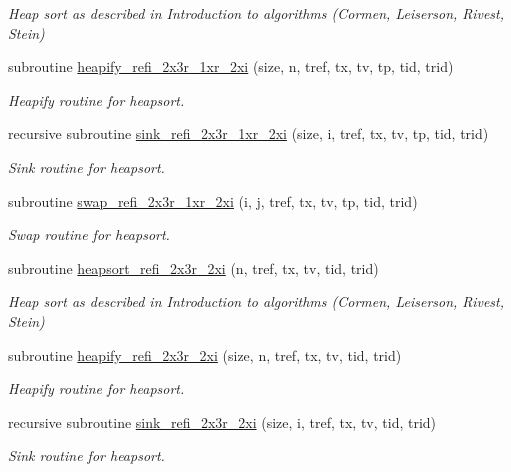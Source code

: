 \begin{DoxyCompactItemize}
\begin{DoxyCompactList}\small\item\em Heap sort as described in Introduction to algorithms (Cormen, Leiserson, Rivest, Stein) \end{DoxyCompactList}\item 
subroutine \hyperlink{classmodsortinterf_a29a5315a689bd72fbc9a80e973c3f483}{heapify\-\_\-refi\-\_\-2x3r\-\_\-1xr\-\_\-2xi} (size, n, tref, tx, tv, tp, tid, trid)
\begin{DoxyCompactList}\small\item\em Heapify routine for heapsort. \end{DoxyCompactList}\item 
recursive subroutine \hyperlink{classmodsortinterf_a7e96a23102d4d62aff260053b1cc3657}{sink\-\_\-refi\-\_\-2x3r\-\_\-1xr\-\_\-2xi} (size, i, tref, tx, tv, tp, tid, trid)
\begin{DoxyCompactList}\small\item\em Sink routine for heapsort. \end{DoxyCompactList}\item 
subroutine \hyperlink{classmodsortinterf_a1fcb9b3d321e7e868665ffd66b01c5ff}{swap\-\_\-refi\-\_\-2x3r\-\_\-1xr\-\_\-2xi} (i, j, tref, tx, tv, tp, tid, trid)
\begin{DoxyCompactList}\small\item\em Swap routine for heapsort. \end{DoxyCompactList}\item 
subroutine \hyperlink{classmodsortinterf_af0070ac4a4a32d7b75892c431a266ce5}{heapsort\-\_\-refi\-\_\-2x3r\-\_\-2xi} (n, tref, tx, tv, tid, trid)
\begin{DoxyCompactList}\small\item\em Heap sort as described in Introduction to algorithms (Cormen, Leiserson, Rivest, Stein) \end{DoxyCompactList}\item 
subroutine \hyperlink{classmodsortinterf_a0bceff7025bb4957c4d34cf93aabe88e}{heapify\-\_\-refi\-\_\-2x3r\-\_\-2xi} (size, n, tref, tx, tv, tid, trid)
\begin{DoxyCompactList}\small\item\em Heapify routine for heapsort. \end{DoxyCompactList}\item 
recursive subroutine \hyperlink{classmodsortinterf_afda4964e3b16e63acf4ca8e2c1e08419}{sink\-\_\-refi\-\_\-2x3r\-\_\-2xi} (size, i, tref, tx, tv, tid, trid)
\begin{DoxyCompactList}\small\item\em Sink routine for heapsort. \end{DoxyCompactList}\item 

\end{DoxyCompactItemize}
